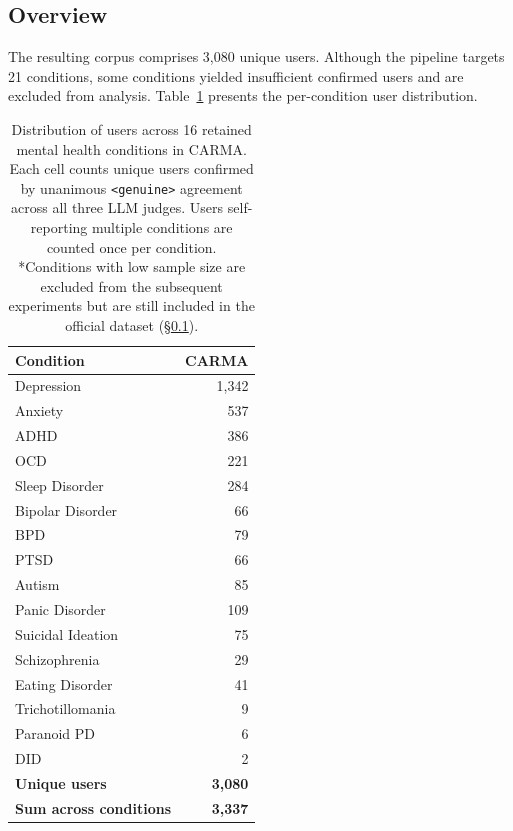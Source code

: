 \documentclass[11pt]{article}
\begin{document}
\subsection{Overview}
\label{subsec:corpus_overview}
The resulting corpus comprises 3,080 unique users. Although the pipeline targets 21 conditions, some conditions yielded insufficient confirmed users and are excluded from analysis. Table~\ref{tab:corpus_summary} presents the per-condition user distribution.


\begin{table}[h]
\centering
\small
\begin{tabular}{lr}
\toprule
\textbf{Condition} & \textbf{CARMA} \\
\midrule
Depression          & 1,342 \\
Anxiety             &   537 \\
ADHD                &   386 \\
OCD                 &   221 \\
Sleep Disorder      &   284 \\
Bipolar Disorder    &    66 \\
BPD                 &    79 \\
PTSD                &    66 \\
Autism              &    85 \\
Panic Disorder      &   109 \\
Suicidal Ideation   &    75 \\
Schizophrenia       &    29 \\
Eating Disorder     &    41 \\
Trichotillomania    &     9 \\
Paranoid PD         &     6 \\
DID                 &     2 \\
\midrule
\textbf{Unique users}          & \textbf{3,080} \\
\textbf{Sum across conditions} & \textbf{3,337} \\
\bottomrule
\end{tabular}
\caption{Distribution of users across 16 retained mental health
conditions in CARMA. Each cell counts unique users
confirmed by unanimous \texttt{<genuine>} agreement across all three
LLM judges. Users self-reporting multiple conditions are counted once
per condition. *Conditions with low sample size are excluded from the subsequent experiments but are still included in the official dataset
(§\ref{subsec:corpus_overview}).}
\label{tab:corpus_summary}
\end{table}
\end{document}
